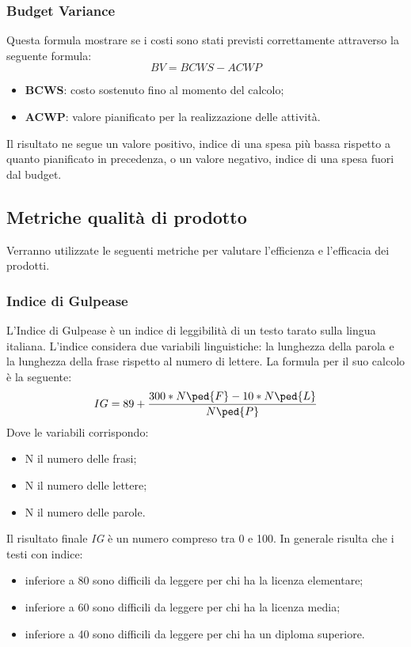 \subsubsection{Budget Variance}
Questa formula mostrare se i costi sono stati previsti correttamente attraverso la seguente formula:
\begin{displaymath}
	BV = BCWS - ACWP
\end{displaymath}
\begin{itemize}
	\item \textbf{BCWS}: costo sostenuto fino al momento del calcolo;
	\item \textbf{ACWP}: valore pianificato per la realizzazione delle attività.
\end{itemize}
Il risultato ne segue un valore positivo, indice di una spesa più bassa rispetto a quanto pianificato in precedenza, o un valore negativo, indice di una spesa fuori dal budget.
\subsection{Metriche qualità di prodotto}
Verranno utilizzate le seguenti metriche per valutare l’efficienza e l’efficacia dei prodotti.
\subsubsection{Indice di Gulpease}
L'Indice di Gulpease è un indice di leggibilità di un testo tarato sulla lingua italiana.
L'indice considera due variabili linguistiche: la lunghezza della parola e la lunghezza della frase rispetto al numero di lettere. La formula per il suo calcolo è la seguente:
\begin{displaymath}
	IG = 89 + {300 * N\ped{F} - 10 * N\ped{L} \over N\ped{P}}
\end{displaymath}
Dove le variabili corrispondo:
\begin{itemize}
	\item N il numero delle frasi;
	\item N il numero delle lettere; 
	\item N il numero delle parole.
\end{itemize}
Il risultato finale  \emph{IG} è un numero compreso tra 0 e 100. In generale risulta che i testi con indice:
\begin{itemize}
	\item inferiore a 80 sono difficili da leggere per chi ha la licenza elementare;
	\item inferiore a 60 sono difficili da leggere per chi ha la licenza media;
	\item inferiore a 40 sono difficili da leggere per chi ha un diploma superiore.
\end{itemize}
